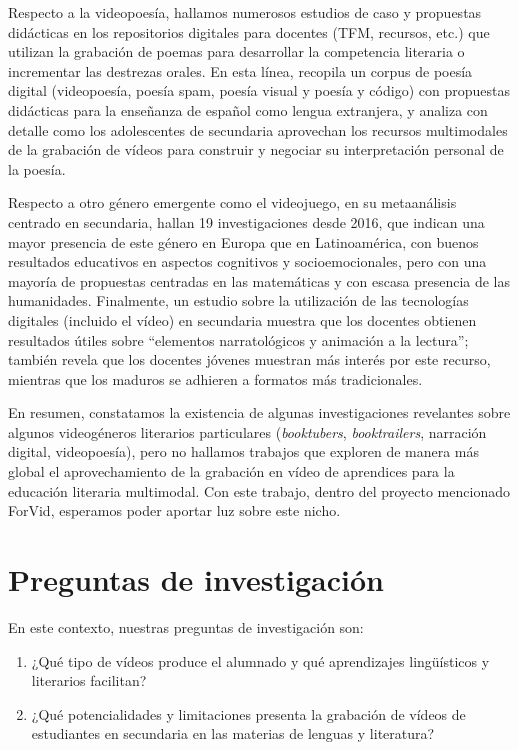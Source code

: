 \documentclass[spanish]{textolivre}
\begin{document}
Respecto a la videopoesía, hallamos numerosos estudios de caso y propuestas didácticas en los repositorios digitales para docentes (TFM, recursos, etc.) que utilizan la grabación de poemas para desarrollar la competencia literaria o incrementar las destrezas orales. En esta línea, \textcite{de_la_torre_literatura_2022} recopila un corpus de poesía digital (videopoesía, poesía spam, poesía visual y poesía y código) con propuestas didácticas para la enseñanza de español como lengua extranjera, y \textcite{hoglund_video_2017} analiza con detalle como los adolescentes de secundaria aprovechan los recursos multimodales de la grabación de vídeos para construir y negociar su interpretación personal de la poesía.

Respecto a otro género emergente como el videojuego, en su metaanálisis centrado en secundaria, \textcite{rojas-garcia_alisis_2022} hallan 19 investigaciones desde 2016, que indican una mayor presencia de este género en Europa que en Latinoamérica, con buenos resultados educativos en aspectos cognitivos y socioemocionales, pero con una mayoría de propuestas centradas en las matemáticas y con escasa presencia de las humanidades. Finalmente, un estudio sobre la utilización de las tecnologías digitales (incluido el vídeo) en secundaria \cite{rodriguez_munoz_competencia_2021} muestra que los docentes obtienen resultados útiles sobre “elementos narratológicos y animación a la lectura”; también revela que los docentes jóvenes muestran más interés por este recurso, mientras que los maduros se adhieren a formatos más tradicionales.

En resumen, constatamos la existencia de algunas investigaciones revelantes sobre algunos videogéneros literarios particulares (\textit{booktubers}, \textit{booktrailers}, narración digital, videopoesía), pero no hallamos trabajos que exploren de manera más global el aprovechamiento de la grabación en vídeo de aprendices para la educación literaria multimodal. Con este trabajo, dentro del proyecto mencionado ForVid, esperamos poder aportar luz sobre este nicho.

\section{Preguntas de investigación}\label{sec-conduta}
En este contexto, nuestras preguntas de investigación son:

\begin{enumerate}
    \item ¿Qué tipo de vídeos produce el alumnado y qué aprendizajes lingüísticos y literarios facilitan?
    \item ¿Qué potencialidades y limitaciones presenta la grabación de vídeos de estudiantes en secundaria en las materias de lenguas y literatura?
\end{enumerate}
\end{document}
